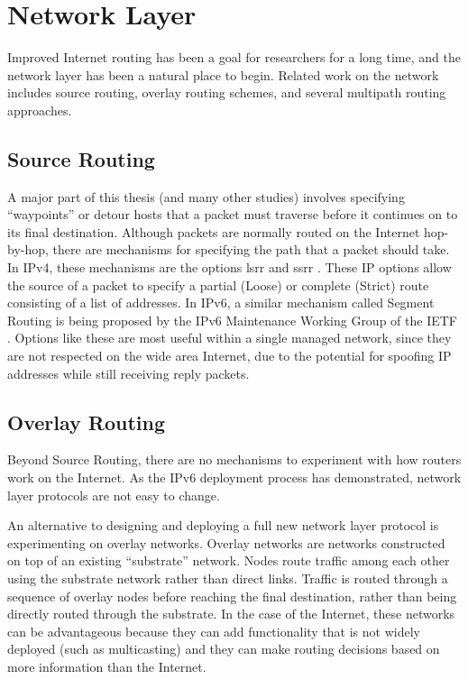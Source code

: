 \documentclass{cwru}
\begin{document}
\section{Network Layer}

Improved Internet routing has been a goal for researchers for a long time, and
the network layer has been a natural place to begin. Related work on the network
includes source routing, overlay routing schemes, and several multipath routing
approaches.

\subsection{Source Routing}

A major part of this thesis (and many other studies) involves specifying
``waypoints'' or detour hosts that a packet must traverse before it continues on
to its final destination. Although packets are normally routed on the Internet
hop-by-hop, there are mechanisms for specifying the path that a packet should
take. In IPv4, these mechanisms are the options \ac{lsrr} and \ac{ssrr}
\cite{rfc791}. These IP options allow the source of a packet to specify a
partial (Loose) or complete (Strict) route consisting of a list of addresses. In
IPv6, a similar mechanism called Segment Routing is being proposed by the IPv6
Maintenance Working Group of the IETF \cite{draft-segment-routing}. Options like
these are most useful within a single managed network, since they are not
respected on the wide area Internet, due to the potential for spoofing IP
addresses while still receiving reply packets.

\subsection{Overlay Routing}

Beyond Source Routing, there are no mechanisms to experiment with how routers
work on the Internet. As the IPv6 deployment process has demonstrated, network
layer protocols are not easy to change.

An alternative to designing and deploying a full new network layer protocol is
experimenting on overlay networks. Overlay networks are networks constructed on
top of an existing ``substrate'' network. Nodes route traffic among each other
using the substrate network rather than direct links. Traffic is routed through
a sequence of overlay nodes before reaching the final destination, rather than
being directly routed through the substrate. In the case of the Internet, these
networks can be advantageous because they can add functionality that is not
widely deployed (such as multicasting) and they can make routing decisions based
on more information than the Internet.
\end{document}
